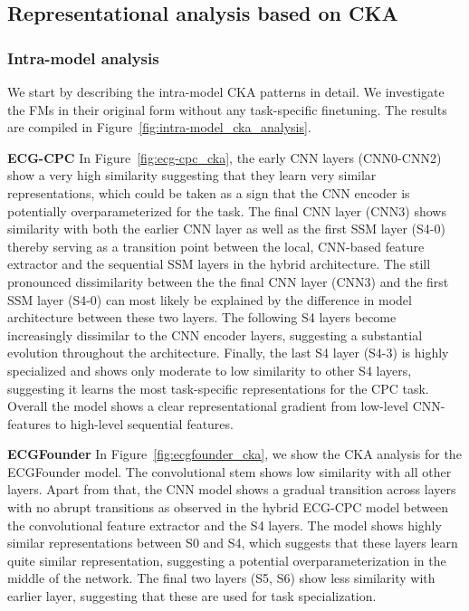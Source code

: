 \documentclass{article}
\newcommand{\heading}[1]{\noindent\textbf{#1}}
\begin{document}
        \subsection{Representational analysis based on CKA}\label{app:cka}
            
            \subsubsection{Intra-model analysis}
            We start by describing the intra-model CKA patterns in detail. We investigate the FMs in their original form without any task-specific finetuning. The results are compiled in Figure~\ref{fig:intra-model_cka_analysis}.

            \heading{ECG-CPC} In Figure~\ref{fig:ecg-cpc_cka}, the early CNN layers (CNN0-CNN2) show a very high similarity suggesting that they learn very similar representations, which could be taken as a sign that the CNN encoder is potentially overparameterized for the task. The final CNN layer (CNN3) shows similarity with both the earlier CNN layer as well as the first SSM layer (S4-0) thereby serving as a transition point between the local, CNN-based feature extractor and the sequential SSM layers in the hybrid architecture. The still pronounced dissimilarity between the the final CNN layer (CNN3) and the first SSM layer (S4-0) can most likely be explained by the difference in model architecture between these two layers. The following S4 layers become increasingly dissimilar to the CNN encoder layers, suggesting a substantial evolution throughout the architecture. Finally, the last S4 layer (S4-3) is highly specialized and shows only moderate to low similarity to other S4 layers, suggesting it learns the most task-specific representations for the CPC task. Overall the model shows a clear representational gradient from low-level CNN-features to high-level sequential features.
            
            \heading{ECGFounder} In Figure~\ref{fig:ecgfounder_cka}, we show the CKA analysis for the ECGFounder model. The convolutional stem shows low similarity with all other layers. Apart from that, the CNN model shows a gradual transition across layers with no abrupt transitions as observed in the hybrid ECG-CPC model between the convolutional feature extractor and the S4 layers. The model shows highly similar representations between S0 and S4, which suggests that these layers learn quite similar representation, suggesting a potential overparameterization in the middle of the network. The final two layers (S5, S6) show less similarity with earlier layer, suggesting that these are used for task specialization. 
            
\end{document}
